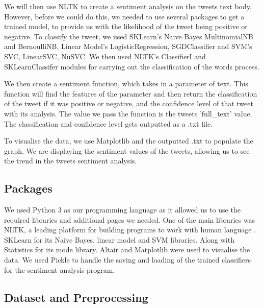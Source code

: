 \documentclass[a4paper,10pt]{article}
\begin{document}
We will then use NLTK to create a sentiment analysis on the tweets text body. However, before we could do this, we needed to use several packages to get a trained model, to provide us with the likelihood of the tweet being positive or negative. To classify the tweet, we used SKLearn's Naive Bayes MultinomialNB and BernoulliNB, Linear Model's LogisticRegression, SGDClassifier and SVM's SVC, LinearSVC, NuSVC. We then used NLTK's ClassifierI and SKLearnClassifer modules for carrying out the classification of the words process. 

We then create a sentiment function, which takes in a parameter of text. This function will find the features of the parameter and then return the classification of the tweet if it was positive or negative, and the confidence level of that tweet with its analysis. The value we pass the function is the tweets 'full\_text' value. The classification and confidence level gets outputted as a .txt file.


To visualise the data, we use Matplotlib and the outputted .txt to populate the graph. We are displaying the sentiment values of the tweets, allowing us to see the trend in the tweets sentiment analysis. 


\subsection{Packages}
We used Python 3 \cite{python} as our programming language as it allowed us to use the required libraries and additional pages we needed. One of the main libraries was NLTK, a leading platform for building programs to work with human language \cite{nltk}. SKLearn for its Naive Bayes, linear model and SVM libraries. Along with Statistics for its mode library. Altair and Matplotlib were used to visualise the data. We used Pickle to handle the saving and loading of the trained classifiers for the sentiment analysis program. 



\subsection{Dataset and Preprocessing}
\end{document}

